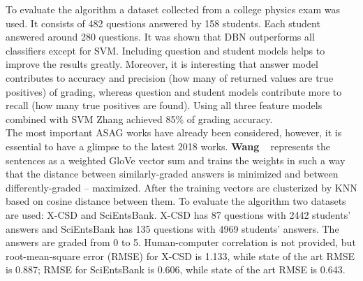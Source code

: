 To evaluate the algorithm a dataset collected from a college physics exam was used. It consists of 482 questions answered by 158 students. Each student answered around 280  questions. It was shown that DBN outperforms all classifiers except for SVM. Including question and student models helps to improve the results greatly. Moreover, it is interesting that answer model contributes to accuracy and precision (how many of returned values are true positives) of grading, whereas question and student models contribute more to recall (how many true positives are found). Using all three feature models combined with SVM Zhang achieved 85\% of grading accuracy.\\

The most important ASAG works have already been considered, however, it is essential to have a glimpse to the latest 2018 works. \textbf{Wang} ~\cite{Wang2} represents the sentences as a weighted GloVe vector sum and trains the weights in such a way that the distance between similarly-graded answers is minimized and between differently-graded -- maximized. After the training vectors are clusterized by KNN based on cosine distance between them. To evaluate the algorithm two datasets are used: X-CSD and SciEntsBank. X-CSD has 87 questions with 2442 students' answers and SciEntsBank has 135 questions with 4969 students' answers. The answers are graded from 0 to 5. Human-computer correlation is not provided, but root-mean-square error (RMSE) for X-CSD is 1.133, while state of the art RMSE is 0.887; RMSE for SciEntsBank is 0.606, while state of the art RMSE is 0.643.\\

